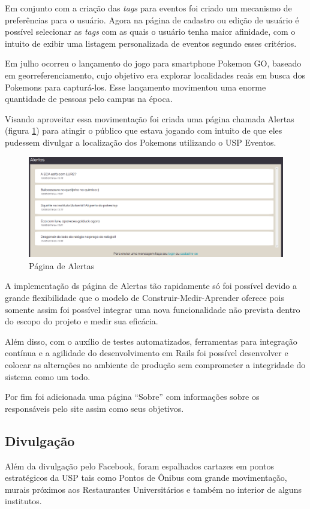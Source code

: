 \par Em conjunto com a criação das \emph{tags} para eventos foi criado um mecanismo de preferências para o usuário. Agora na página de cadastro ou edição de usuário é possível selecionar as \emph{tags} com as quais o usuário tenha maior afinidade, com o intuito de exibir uma listagem personalizada de eventos segundo esses critérios.
\par Em julho ocorreu o lançamento do jogo para smartphone Pokemon GO, baseado em georreferenciamento, cujo objetivo era explorar localidades reais em busca dos
Pokemons para capturá-los. Esse lançamento movimentou uma enorme quantidade de pessoas pelo campus na época.
\par Visando aproveitar essa movimentação foi criada uma página chamada Alertas (figura \ref{fig:alert_page}) para atingir o público que estava jogando com intuito de que eles pudessem divulgar a localização dos Pokemons utilizando o USP Eventos.
\begin{figure}[htb]
\centering
\includegraphics[width=15cm]{figuras/alert_page}
\centering
\caption{\label{fig:alert_page} Página de Alertas}
\end{figure}
\par A implementação ds página de Alertas tão rapidamente só foi possível devido a grande flexibilidade que o modelo de Construir-Medir-Aprender oferece pois somente assim foi possível integrar uma nova funcionalidade não prevista dentro do escopo do projeto e medir sua eficácia.
\par Além disso, com o auxílio de testes automatizados, ferramentas para integração contínua e a agilidade do desenvolvimento em Rails foi possível desenvolver e colocar as alterações no ambiente de produção sem comprometer a integridade do sistema como um todo.
\par Por fim foi adicionada uma página ``Sobre'' com informações sobre os responsáveis pelo site assim como seus objetivos.
\subsection{Divulgação}
\par Além da divulgação pelo Facebook, foram espalhados cartazes em pontos estratégicos da USP tais como Pontos de Ônibus com grande movimentação, murais próximos aos Restaurantes Universitários e também no interior de alguns institutos.

